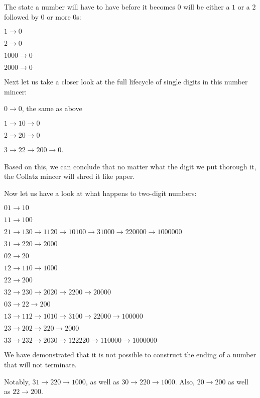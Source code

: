 \documentclass{proc-l}
\theoremstyle{definition}
\theoremstyle{remark}
\numberwithin{equation}{section}
\begin{document}
The state a number will have to have before it becomes $0$ will be either a $1$ or a $2$ followed by 0 or more $0$s:

$1 \rightarrow 0$ 

$2 \rightarrow 0$

$1000 \rightarrow 0$

$2000 \rightarrow 0$

Next let us take a closer look at the full lifecycle of single digits in this number mincer:   

$0 \rightarrow 0$, the same as above 

$1 \rightarrow 10 \rightarrow 0$

$2 \rightarrow 20 \rightarrow 0$

$3 \rightarrow 22 \rightarrow 200 \rightarrow 0$.

Based on this, we can conclude that no matter what the digit we put thorough it, the Collatz mincer will shred it like paper.

Now let us have a look at what happens to two-digit numbers:

$01 \rightarrow 10$

$11 \rightarrow 100$

$21 \rightarrow 130 \rightarrow 1120 \rightarrow 10100 \rightarrow 31000 \rightarrow 220000 \rightarrow 1000000$

$31 \rightarrow 220 \rightarrow 2000$

$02 \rightarrow 20$

$12 \rightarrow 110 \rightarrow 1000$

$22 \rightarrow 200$

$32 \rightarrow 230 \rightarrow 2020 \rightarrow 2200 \rightarrow 20000$

$03 \rightarrow 22 \rightarrow 200$

$13 \rightarrow 112 \rightarrow 1010 \rightarrow 3100 \rightarrow 22000 \rightarrow 100000$

$23 \rightarrow 202 \rightarrow 220 \rightarrow 2000$

$33 \rightarrow 232 \rightarrow 2030 \rightarrow 122220 \rightarrow 110000 \rightarrow 1000000$

We have demonstrated that it is not possible to construct the ending of a number that will not terminate.

Notably, $31 \rightarrow 220 \rightarrow 1000$, as well as $30 \rightarrow 220 \rightarrow 1000$.  Also, $20 \rightarrow 200$ as well as $22 \rightarrow 200$.

\addtocounter{section}{6}
\end{document}
